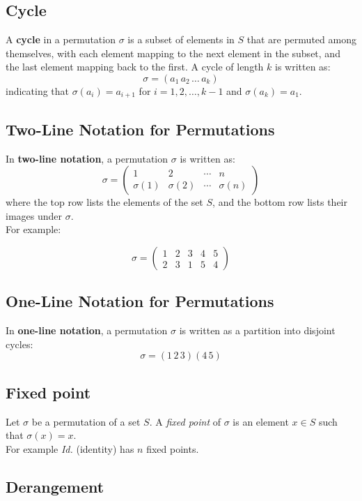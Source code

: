 \documentclass{article}
\begin{document}
\subsection{Cycle}
A \textbf{cycle} in a permutation \(\sigma\) is a subset of elements in \(S\) that are permuted among themselves, with each element mapping to the next element in the subset, and the last element mapping back to the first. A cycle of length \(k\) is written as:
\[
\sigma = (a_1 \, a_2 \, \ldots \, a_k)
\]
indicating that \(\sigma(a_i) = a_{i+1}\) for \(i = 1, 2, \ldots, k-1\) and \(\sigma(a_k) = a_1\).

\subsection{Two-Line Notation for Permutations}
In \textbf{two-line notation}, a permutation \(\sigma\) is written as:
\[
\sigma = \begin{pmatrix}
1 & 2 & \cdots & n \\
\sigma(1) & \sigma(2) & \cdots & \sigma(n)
\end{pmatrix}
\]
where the top row lists the elements of the set \(S\), and the bottom row lists their images under \(\sigma\).\\
For example:

\[
\sigma = \begin{pmatrix}
1 & 2 & 3 & 4 & 5 \\
2 & 3 & 1 & 5 & 4
\end{pmatrix}
\]

\subsection{One-Line Notation for Permutations}
In \textbf{one-line notation}, a permutation \(\sigma\) is written as a partition into disjoint cycles:
\[
\sigma = (1\, 2\, 3)(4\, 5)
\]

\subsection{Fixed point}

Let \(\sigma\) be a permutation of a set \(S\). A \textit{fixed point} of \(\sigma\) is an element \(x \in S\) such that \(\sigma(x) = x\).\\
For example \textit{Id.} (identity) has $n$ fixed points.

\subsection{Derangement}
\end{document}
